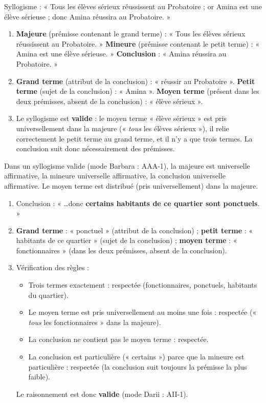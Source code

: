 \documentclass[11pt]{article}
\begin{document}
\begin{corrige}
Syllogisme : « Tous les élèves sérieux réussissent au Probatoire ; or Amina est une élève sérieuse ; donc Amina réussira au Probatoire. »
\begin{enumerate}
\item \textbf{Majeure} (prémisse contenant le grand terme) : « Tous les élèves sérieux réussissent au Probatoire. » \textbf{Mineure} (prémisse contenant le petit terme) : « Amina est une élève sérieuse. » \textbf{Conclusion} : « Amina réussira au Probatoire. »
\item \textbf{Grand terme} (attribut de la conclusion) : « réussir au Probatoire ». \textbf{Petit terme} (sujet de la conclusion) : « Amina ». \textbf{Moyen terme} (présent dans les deux prémisses, absent de la conclusion) : « élève sérieux ».
\item Le syllogisme est \textbf{valide} : le moyen terme « élève sérieux » est pris universellement dans la majeure (« \emph{tous} les élèves sérieux »), il relie correctement le petit terme au grand terme, et il n'y a que trois termes. La conclusion suit donc nécessairement des prémisses.
\end{enumerate}
\end{corrige}

\begin{attention}
Dans un syllogisme valide (mode Barbara : AAA-1), la majeure est universelle affirmative, la mineure universelle affirmative, la conclusion universelle affirmative. Le moyen terme est distribué (pris universellement) dans la majeure.
\end{attention}

\begin{corrige}
\begin{enumerate}
\item Conclusion : « \ldots donc \textbf{certains habitants de ce quartier sont ponctuels}. »
\item \textbf{Grand terme} : « ponctuel » (attribut de la conclusion) ; \textbf{petit terme} : « habitants de ce quartier » (sujet de la conclusion) ; \textbf{moyen terme} : « fonctionnaires » (dans les deux prémisses, absent de la conclusion).
\item Vérification des règles :
\begin{itemize}
\item Trois termes exactement : respectée (fonctionnaires, ponctuels, habitants du quartier).
\item Le moyen terme est pris universellement au moins une fois : respectée (« \emph{tous} les fonctionnaires » dans la majeure).
\item La conclusion ne contient pas le moyen terme : respectée.
\item La conclusion est particulière (« certains ») parce que la mineure est particulière : respectée (la conclusion suit toujours la prémisse la plus faible).
\end{itemize}
Le raisonnement est donc \textbf{valide} (mode Darii : AII-1).
\end{enumerate}
\end{corrige}
\end{document}
